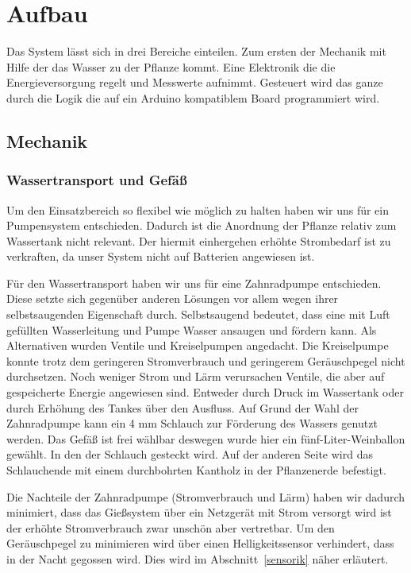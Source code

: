 \documentclass[]{IEEEtran}
\begin{document}
\section{Aufbau}
Das System lässt sich in drei Bereiche einteilen. Zum ersten der Mechanik mit Hilfe der das Wasser zu der Pflanze kommt. Eine Elektronik die die Energieversorgung regelt und Messwerte aufnimmt. Gesteuert wird das ganze durch die Logik die auf ein Arduino kompatiblem Board programmiert wird.
\subsection{Mechanik}
	\subsubsection{Wassertransport und Gefäß}
	Um den Einsatzbereich so flexibel wie möglich zu halten haben wir uns für ein Pumpensystem entschieden. Dadurch ist die Anordnung der Pflanze relativ zum Wassertank nicht relevant. Der hiermit einhergehen erhöhte Strombedarf ist zu verkraften, da unser System nicht auf Batterien angewiesen ist.
	
	Für den Wassertransport haben wir uns für eine Zahnradpumpe entschieden. Diese setzte sich gegenüber anderen Lösungen vor allem wegen ihrer selbstsaugenden Eigenschaft durch. Selbstsaugend bedeutet, dass eine mit Luft gefüllten Wasserleitung und Pumpe Wasser ansaugen und fördern kann. Als Alternativen wurden Ventile und Kreiselpumpen angedacht. Die Kreiselpumpe konnte trotz dem geringeren Stromverbrauch und geringerem Geräuschpegel nicht durchsetzen. Noch weniger Strom und Lärm verursachen Ventile, die aber auf gespeicherte Energie angewiesen sind. Entweder durch Druck im Wassertank oder durch Erhöhung des Tankes über den Ausfluss. Auf Grund der Wahl der Zahnradpumpe kann ein 4 mm Schlauch zur Förderung des Wassers genutzt werden. Das Gefäß ist frei wählbar deswegen wurde hier ein fünf-Liter-Weinballon gewählt. In den der Schlauch gesteckt wird. Auf der anderen Seite wird das Schlauchende mit einem durchbohrten Kantholz in der Pflanzenerde befestigt.
	
	Die Nachteile der Zahnradpumpe (Stromverbrauch und Lärm) haben wir dadurch minimiert, dass das Gießsystem über ein Netzgerät mit Strom versorgt wird ist der erhöhte Stromverbrauch zwar unschön aber vertretbar. Um den Geräuschpegel zu minimieren wird über einen Helligkeitssensor verhindert, dass in der Nacht gegossen wird. Dies wird im Abschnitt~\ref{sensorik} näher erläutert.
	
\end{document}
